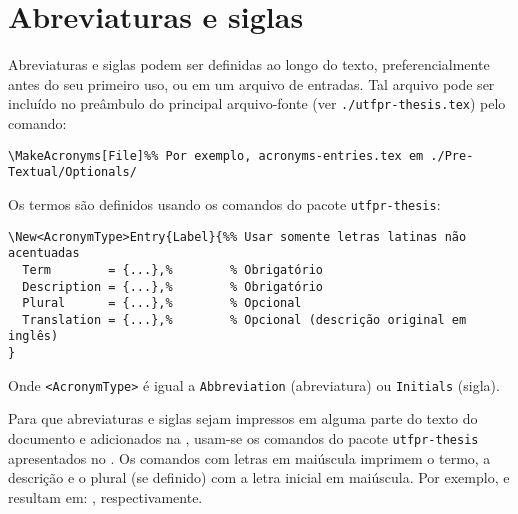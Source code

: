 \section{Abreviaturas e siglas}%
\label{sect:acr}

Abreviaturas e siglas podem ser definidas ao longo do texto, preferencialmente antes do seu primeiro uso, ou em um arquivo de entradas.
Tal arquivo pode ser incluído no preâmbulo do principal arquivo-fonte (ver \texttt{./utfpr-thesis.tex}) pelo comando:

\begin{snugshade}
\begin{Verbatim}
\MakeAcronyms[File]%% Por exemplo, acronyms-entries.tex em ./Pre-Textual/Optionals/
\end{Verbatim}
\end{snugshade}

Os termos são definidos usando os comandos do pacote \texttt{utfpr-thesis}:

\begin{snugshade}
\begin{Verbatim}
\New<AcronymType>Entry{Label}{%% Usar somente letras latinas não acentuadas
  Term        = {...},%        % Obrigatório
  Description = {...},%        % Obrigatório
  Plural      = {...},%        % Opcional
  Translation = {...},%        % Opcional (descrição original em inglês)
}
\end{Verbatim}
\end{snugshade}

\noindent Onde \texttt{<AcronymType>} é igual a \texttt{Abbreviation} (abreviatura) ou \texttt{Initials} (sigla).

Para que abreviaturas e siglas sejam impressos em alguma parte do texto do documento e adicionados na \acrref, usam-se os comandos do pacote \texttt{utfpr-thesis} apresentados no .
Os comandos com letras em maiúscula imprimem o termo, a descrição e o plural (se definido) com a letra inicial em maiúscula.
Por exemplo,  e  resultam em: , respectivamente.

